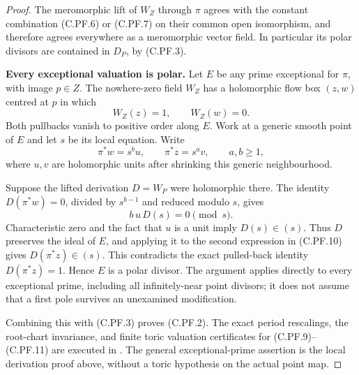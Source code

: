\begin{proof}
The meromorphic lift of \(W_Z\) through \(\pi\)
agrees with the constant combination (C.PF.6)
or (C.PF.7) on their common open isomorphism,
and therefore agrees everywhere as a
meromorphic vector field. In particular its
polar divisors are contained in \(D_P\), by
(C.PF.3).

\par\medskip\noindent\textbf{Every exceptional valuation is polar.}
Let \(E\) be any prime exceptional for \(\pi\),
with image \(p\in Z\). The nowhere-zero field
\(W_Z\) has a holomorphic flow box \((z,w)\)
centred at \(p\) in which
\[
                   W_Z(z)=1,\qquad W_Z(w)=0.
 \tag{C.PF.9}
\]
Both pullbacks vanish to positive order along
\(E\). Work at a generic smooth point of \(E\)
and let \(s\) be its local equation. Write
\[
            \pi^*w=s^b u,\qquad
            \pi^*z=s^a v,\qquad a,b\ge1,
 \tag{C.PF.10}
\]
where \(u,v\) are holomorphic units after
shrinking this generic neighbourhood.

Suppose the lifted derivation \(D=W_P\) were
holomorphic there. The identity
\(D(\pi^*w)=0\), divided by \(s^{b-1}\) and
reduced modulo \(s\), gives
\[
                    b\,u\,D(s)=0\pmod{s}.
 \tag{C.PF.11}
\]
Characteristic zero and the fact that \(u\)
is a unit imply \(D(s)\in(s)\). Thus \(D\)
preserves the ideal of \(E\), and applying it
to the second expression in (C.PF.10) gives
\(D(\pi^*z)\in(s)\). This contradicts the
exact pulled-back identity \(D(\pi^*z)=1\).
Hence \(E\) is a polar divisor. The argument
applies directly to every exceptional prime,
including all infinitely-near point divisors;
it does not assume that a first pole survives
an unexamined modification.

Combining this with (C.PF.3) proves (C.PF.2).
The exact period rescalings, the root-chart
invariance, and finite toric valuation
certificates for (C.PF.9)--(C.PF.11) are
executed in .
The general exceptional-prime assertion is
the local derivation proof above, without a
toric hypothesis on the actual point map.
\end{proof}
